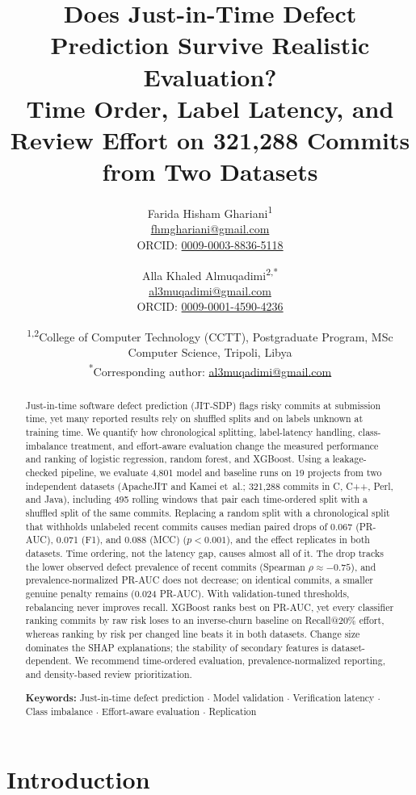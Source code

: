 \documentclass[11pt,a4paper]{article}
\title{Does Just-in-Time Defect Prediction Survive Realistic Evaluation?\\[0.3em]
\large Time Order, Label Latency, and Review Effort on 321{,}288 Commits from Two Datasets}
\author{%
Farida Hisham Ghariani\textsuperscript{1}\\
{\small \href{mailto:fhmghariani@gmail.com}{fhmghariani@gmail.com}}\\
{\small ORCID: \href{https://orcid.org/0009-0003-8836-5118}{0009-0003-8836-5118}}
\and
Alla Khaled Almuqadimi\textsuperscript{2,*}\\
{\small \href{mailto:al3muqadimi@gmail.com}{al3muqadimi@gmail.com}}\\
{\small ORCID: \href{https://orcid.org/0009-0001-4590-4236}{0009-0001-4590-4236}}}
\date{\small\textsuperscript{1,2}College of Computer Technology (CCTT), Postgraduate Program, MSc Computer Science, Tripoli, Libya\\[0.3em]
\textsuperscript{*}Corresponding author: \href{mailto:al3muqadimi@gmail.com}{al3muqadimi@gmail.com}}
\begin{document}
\maketitle

\begin{abstract}
\noindent Just-in-time software defect prediction (JIT-SDP) flags risky commits at submission time, yet many reported results rely on shuffled splits and on labels unknown at training time. We quantify how chronological splitting, label-latency handling, class-imbalance treatment, and effort-aware evaluation change the measured performance and ranking of logistic regression, random forest, and XGBoost. Using a leakage-checked pipeline, we evaluate 4{,}801 model and baseline runs on 19 projects from two independent datasets (ApacheJIT and Kamei et~al.; 321{,}288 commits in C, C++, Perl, and Java), including 495 rolling windows that pair each time-ordered split with a shuffled split of the same commits. Replacing a random split with a chronological split that withholds unlabeled recent commits causes median paired drops of 0.067 (PR-AUC), 0.071 (F1), and 0.088 (MCC) ($p<0.001$), and the effect replicates in both datasets. Time ordering, not the latency gap, causes almost all of it. The drop tracks the lower observed defect prevalence of recent commits (Spearman $\rho\approx-0.75$), and prevalence-normalized PR-AUC does not decrease; on identical commits, a smaller genuine penalty remains (0.024 PR-AUC). With validation-tuned thresholds, rebalancing never improves recall. XGBoost ranks best on PR-AUC, yet every classifier ranking commits by raw risk loses to an inverse-churn baseline on Recall@20\% effort, whereas ranking by risk per changed line beats it in both datasets. Change size dominates the SHAP explanations; the stability of secondary features is dataset-dependent. We recommend time-ordered evaluation, prevalence-normalized reporting, and density-based review prioritization.

\medskip\noindent\textbf{Keywords:} Just-in-time defect prediction $\cdot$ Model validation $\cdot$ Verification latency $\cdot$ Class imbalance $\cdot$ Effort-aware evaluation $\cdot$ Replication
\end{abstract}

\section{Introduction}\label{sec:intro}
\end{document}
